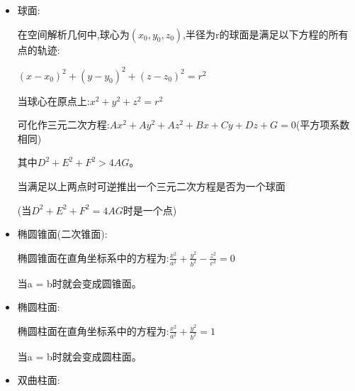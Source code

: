 \documentclass[UTF8]{ctexbook}
\begin{document}
{{{{\begin{itemize}
{\begin{itemize}
{                      用另一种方法来描述,类球面是一种椭球面。而椭球面的公式已经给出,其中a与b分别是椭球面在x轴与y轴的赤道半径,c是椭球面在z轴的极半径,这三个正实数的半径决定了椭球面的形状。以z轴为旋转轴的类球面a = b,他的方程为:

                      $\frac{x^2 + y^2}{a^2} + \frac{z^2}{c^2} = 1$

                      \begin{itemize}
                        \item 如果三个半径都相等,则此椭球面是圆球面$(a = c)$
                        \item 如果类球面的赤道半径小于极半径,则这是类球面中的长球面。$(a < c)$
                        \item 如果类球面的赤道半径大于极半径,则这是类球面中的扁球面。$(a > c)$
                      \end{itemize}
                      }
                \item {
                      球面:

                      在空间解析几何中,球心为$(x_0,y_0,z_0)$,半径为r的球面是满足以下方程的所有点的轨迹:

                      $(x - x_0)^2 + (y - y_0)^2 + (z - z_0)^2 = r^2$

                      当球心在原点上:$x^2 + y^2 + z^2 = r^2$

                      可化作三元二次方程:$Ax^2 + Ay^2 + Az^2 + Bx + Cy + Dz + G = 0$(平方项系数相同)

                      其中$D^2 + E^2 + F^2 > 4AG$。

                      当满足以上两点时可逆推出一个三元二次方程是否为一个球面

                      (当$D^2 + E^2 + F^2 = 4AG$时是一个点)
                      }
                \item {
                      椭圆锥面(二次锥面):

                      椭圆锥面在直角坐标系中的方程为:$\frac{x^2}{a^2} + \frac{y^2}{b^2} - \frac{z^2}{c^2} = 0$

                      当a = b时就会变成圆锥面。
                      }
                \item {
                      椭圆柱面:

                      椭圆柱面在直角坐标系中的方程为:$\frac{x^2}{a^2} + \frac{y^2}{b^2} = 1$

                      当a = b时就会变成圆柱面。
                      }
                \item {
                      双曲柱面:

}
\end{itemize}}
\end{itemize}}}}}
\end{document}

